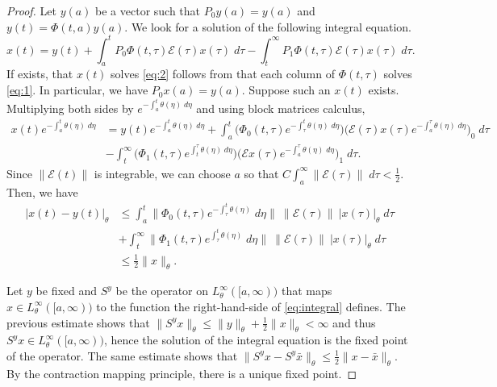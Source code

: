 \documentclass[a4paper,11pt]{article}
\newcommand{\E}{\mathcal{E}}
\theoremstyle{remark}
\begin{document}
\begin{proof}
Let $y(a)$ be a vector such that $P_0y(a) = y(a)$ and $y(t) = \Phi(t,a)y(a)$. We look for a solution of the following integral equation.
\begin{equation*} \label{eq:integral}
x(t) = y(t) + \int_a^t P_0\Phi(t,\tau)\E(\tau)x(\tau) \;d\tau - \int_t^\infty P_1\Phi(t,\tau)\E(\tau)x(\tau) \; d\tau.
\end{equation*}
If exists, that $x(t)$ solves \eqref{eq:2} follows from that each column of $\Phi(t,\tau)$ solves \eqref{eq:1}. In particular, we have $P_0x(a) = y(a)$.
Suppose such an $x(t)$ exists. Multiplying both sides by $e^{-\int_a^t \theta(\eta) \;d\eta}$ and using block matrices calculus, 
\begin{equation} \label{eq:integral2}
\begin{aligned}
x(t)e^{-\int_a^t \theta(\eta) \;d\eta} &= y(t)e^{-\int_a^t \theta(\eta) \;d\eta} + \int_a^t \big(\Phi_0(t,\tau)e^{-\int_\tau^t \theta(\eta) \;d\eta}\big)\big(\E(\tau) x(\tau)e^{-\int_a^\tau \theta(\eta) \;d\eta}\big)_0 \;d\tau \\
&- \int_t^\infty \big(\Phi_1(t,\tau)e^{\int_t^\tau \theta(\eta) \;d\eta}\big) \big(\E x(\tau)e^{-\int_a^\tau \theta(\eta) \;d\eta}\big)_1 \; d\tau.
\end{aligned}
\end{equation}
Since $\|\E(t)\|$ is integrable, we can choose $a$ so that $C\int_a^\infty \|\E(\tau)\| \;d\tau < \frac{1}{2}$. Then, we have
\begin{align*}
|x(t)-y(t)|_{\theta} &\le \int_a^t \|\Phi_0(t,\tau)e^{-\int_\tau^t \theta(\eta)}\;d\eta\| \:\|\E(\tau)\| \: |x(\tau)|_\theta \; d\tau \\
&+ \int_t^\infty \|\Phi_1(t,\tau)e^{\int_\tau^t \theta(\eta)}\;d\eta\| \: \|\E(\tau)\| \:|x(\tau)|_\theta \; d\tau\\
&\le \frac{1}{2}\|x\|_{\theta}.
\end{align*}

Let $y$ be fixed and $S^y$ be the operator on $L^\infty_{\theta}([a,\infty))$ that maps $x \in L^\infty_{\theta}([a,\infty))$ to the function the right-hand-side of \eqref{eq:integral} defines. The previous estimate shows that $\|S^y x\|_\theta \le \|y\|_\theta + \frac{1}{2} \|x\|_\theta < \infty$ and thus $S^y x \in L^\infty_{\theta}([a,\infty))$, hence the solution of the integral equation is the fixed point of the operator. The same estimate shows that $\|S^y x - S^y \bar{x}\|_\theta \le \frac{1}{2} \|x-\bar{x}\|_\theta$. By the contraction mapping principle, there is a unique fixed point. 


\end{proof}
\end{document}
